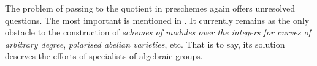 The problem of passing to the quotient in preschemes again offers unresolved questions.
The most important is mentioned in .
It currently remains as the only obstacle to the construction of \emph{schemes of modules over the integers for curves of arbitrary degree}, \emph{polarised abelian varieties}, etc.
That is to say, its solution deserves the efforts of specialists of algebraic groups.
